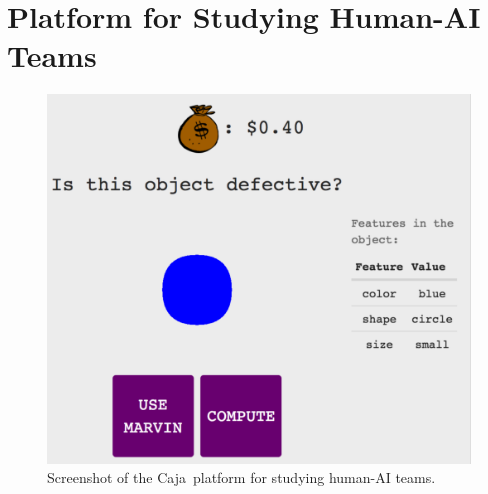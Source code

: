 \documentclass[letterpaper]{article} %
\newcommand{\bug}
    {\mbox{\rule{2mm}{2mm}}}
\newcommand{\Bug}[1]
    {\bug \footnote{BUG: {#1}}}
\newcommand{\?}{\mbox{?}}
\newcommand{\plat}{{\sc Caja}}
\newcommand{\hone}{\mbox{$h_1$}}
\newcommand{\htwo}{\mbox{$h_2$}}
\newcommand{\loss}{L}
\newcommand{\dissonance}{\mathcal{D}}
\begin{document}


\section{Platform for Studying Human-AI Teams}
\begin{figure}[t]
    \centering
    \includegraphics[width=0.8\linewidth]{tutorial-1.png}
    \caption{Screenshot of the \plat\ platform for studying human-AI teams.}
    \label{fig:ui}
\end{figure}  
\end{document}
